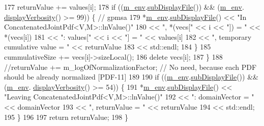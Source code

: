 \begin{DoxyCode}
177     returnValue += values[i];
178     \textcolor{keywordflow}{if} ((\hyperlink{class_q_u_e_s_o_1_1_base_scalar_function_adf44141aeb765d97613286f88f235f04}{m\_env}.\hyperlink{class_q_u_e_s_o_1_1_base_environment_a8a0064746ae8dddfece4229b9ad374d6}{subDisplayFile}()) && (\hyperlink{class_q_u_e_s_o_1_1_base_scalar_function_adf44141aeb765d97613286f88f235f04}{m\_env}.
      \hyperlink{class_q_u_e_s_o_1_1_base_environment_a1fe5f244fc0316a0ab3e37463f108b96}{displayVerbosity}() >= 99)) \{  \textcolor{comment}{// gpmsa}
179       *\hyperlink{class_q_u_e_s_o_1_1_base_scalar_function_adf44141aeb765d97613286f88f235f04}{m\_env}.\hyperlink{class_q_u_e_s_o_1_1_base_environment_a8a0064746ae8dddfece4229b9ad374d6}{subDisplayFile}() << \textcolor{stringliteral}{"In ConcatenatedJointPdf<V,M>::lnValue()"}
180                               << \textcolor{stringliteral}{", *(vecs["} << i << \textcolor{stringliteral}{"]) = "}       << *(vecs[i])
181                               << \textcolor{stringliteral}{": values["} << i << \textcolor{stringliteral}{"] = "}        << values[i]
182                               << \textcolor{stringliteral}{", temporary cumulative value = "} << returnValue
183                               << std::endl;
184     \}
185     cummulativeSize += vecs[i]->sizeLocal();
186     \textcolor{keyword}{delete} vecs[i];
187   \}
188   \textcolor{comment}{//returnValue += m\_logOfNormalizationFactor; // No need, because each PDF should be already normalized
       [PDF-11]}
189 
190   \textcolor{keywordflow}{if} ((\hyperlink{class_q_u_e_s_o_1_1_base_scalar_function_adf44141aeb765d97613286f88f235f04}{m\_env}.\hyperlink{class_q_u_e_s_o_1_1_base_environment_a8a0064746ae8dddfece4229b9ad374d6}{subDisplayFile}()) && (\hyperlink{class_q_u_e_s_o_1_1_base_scalar_function_adf44141aeb765d97613286f88f235f04}{m\_env}.
      \hyperlink{class_q_u_e_s_o_1_1_base_environment_a1fe5f244fc0316a0ab3e37463f108b96}{displayVerbosity}() >= 54)) \{
191     *\hyperlink{class_q_u_e_s_o_1_1_base_scalar_function_adf44141aeb765d97613286f88f235f04}{m\_env}.\hyperlink{class_q_u_e_s_o_1_1_base_environment_a8a0064746ae8dddfece4229b9ad374d6}{subDisplayFile}() << \textcolor{stringliteral}{"Leaving ConcatenatedJointPdf<V,M>::lnValue()"}
192                             << \textcolor{stringliteral}{": domainVector = "} << domainVector
193                             << \textcolor{stringliteral}{", returnValue = "}  << returnValue
194                             << std::endl;
195   \}
196 
197   \textcolor{keywordflow}{return} returnValue;
198 \}
\end{DoxyCode}

